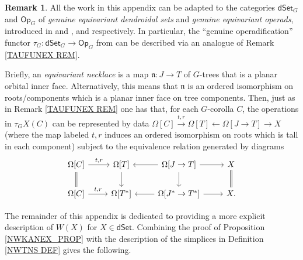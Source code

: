 \documentclass[a4paper,10pt
,draft
]{article}%
\numberwithin{equation}{section}
\numberwithin{figure}{section}
\theoremstyle{definition} %
\newtheorem{remark}[equation]{Remark}%
\newcommand{\1}{\ensuremath{\mathbbm 1}}%
\begin{document}
\begin{remark}\label{GTAUFUNEX REM}
	All the work in this appendix can be adapted to the categories
	$\mathsf{dSet}_G$ and $\mathsf{Op}_G$
	of \textit{genuine equivariant dendroidal sets} and \textit{genuine equivariant operads},
	introduced in \cite[\S 5.4]{Per18} and \cite[\S \ref{TAS-EDS_SEC}]{BP_TAS}, and \cite{BP_geo} respectively.
%	
	In particular, 
	the ``genuine operadification'' functor
	$\tau_G \colon \mathsf{dSet}_G \to \mathsf{Op}_G$
	from
	\cite[Eq. \eqref{TAS-TAUFUNCTS EQ}]{BP_TAS}
	can be described via an analogue of
	Remark \ref{TAUFUNEX REM}.
	
Briefly,
an \emph{equivariant necklace}
is a map $\mathfrak{n} \colon J \to T$ of $G$-trees
that is a planar orbital inner face.
Alternatively, this means that $\mathfrak{n}$
is an ordered isomorphism on roots/components which is a planar inner face on tree components. 
%
Then, just as in Remark \ref{TAUFUNEX REM}
one has that, for each $G$-corolla $C$,
the operations in 
$\tau_G X(C)$
can be represented by data
$\Omega[C] \xrightarrow{t,r}
\Omega[T] \leftarrow
\Omega[J \to T] \to 
X$
(where the map labeled $t,r$ induces an ordered isomorphism on roots which is tall in each component)
subject to the equivalence relation generated by diagrams
\[
\begin{tikzcd}
\Omega[C] \ar{r}{t,r} \ar[equal]{d} &
\Omega[T] \ar{d} &
\Omega[J \to T] \ar{l} \ar{r} \ar{d} &
X \ar[equal]{d}
\\
\Omega[C] \ar{r}{t,r} &
\Omega[T^{\**}] &
\Omega[J^{\**} \to T^{\**}] \ar{l} \ar{r} &
X.
\end{tikzcd}
\]

\end{remark}




The remainder of this appendix is dedicated to providing a more explicit description of $W(X)$ for $X \in \mathsf{dSet}$.
%
Combining the proof of Proposition \ref{NWKANEX_PROP}
with the description of the simplices 
in Definition \ref{NWTNS DEF} gives the following.
\end{document}
